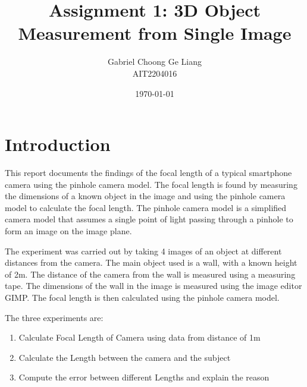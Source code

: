 \documentclass{article}
\title{Assignment 1: 3D Object Measurement from Single Image}
\author{
  Gabriel Choong Ge Liang \\
  AIT2204016 \\
  }
\date{\today}
\begin{document}
\maketitle

\section{Introduction}
This report documents the findings of the focal length of a typical smartphone camera using the pinhole camera model. The focal length is found by measuring the dimensions of a known object in the image and using the pinhole camera model to calculate the focal length. The pinhole camera model is a simplified camera model that assumes a single point of light passing through a pinhole to form an image on the image plane.

The experiment was carried out by taking 4 images of an object at different distances from the camera. The main object used is a wall, with a known height of 2m. The distance of the camera from the wall is measured using a measuring tape. The dimensions of the wall in the image is measured using the image editor GIMP. The focal length is then calculated using the pinhole camera model.

The three experiments are:
\begin{enumerate}
  \item Calculate Focal Length of Camera using data from distance of 1m
  \item Calculate the Length between the camera and the subject
  \item Compute the error between different Lengths and explain the reason
\end{enumerate}
\end{document}
